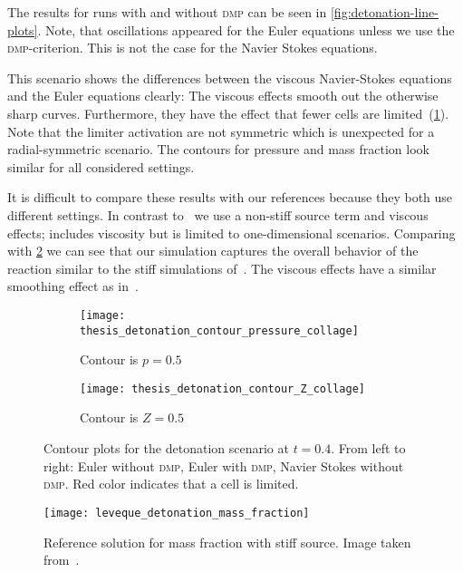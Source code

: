 The results for runs with and without \textsc{dmp} can be seen in \cref{fig:detonation-line-plots}.
Note, that oscillations appeared for the Euler equations unless we use the \textsc{dmp}-criterion.
This is not the case for the Navier Stokes equations.

This scenario shows the differences between the viscous Navier-Stokes equations and the Euler equations clearly:
The viscous effects smooth out the otherwise sharp curves.
Furthermore, they have the effect that fewer cells are limited~(\cref{fig:detonation-pressure-contour}).
Note that the limiter activation are not symmetric which is unexpected for a radial-symmetric scenario.
The contours for pressure and mass fraction look similar for all considered settings.

It is difficult to compare these results with our references because they both use different settings.
In contrast to~\cite{helzel2000modified} we use a non-stiff source term and viscous effects; \cite{hidalgo2011ader} includes viscosity but is limited to one-dimensional scenarios.
Comparing with \cref{fig:detonation-contour-reference} we can see that our simulation captures the overall behavior of the reaction similar to the stiff simulations of~\cite{helzel2000modified}.
The viscous effects have a similar smoothing effect as in~\cite{hidalgo2011ader}.

\begin{figure}[htb]
  \centering
  \begin{subfigure}[t]{1.0\textwidth}
    \centering
  \texttt{[image: thesis\_detonation\_contour\_pressure\_collage]} 
  \caption{Contour is $p = 0.5$}
  \end{subfigure}
  \begin{subfigure}[t]{1.0\textwidth}
    \centering
  \texttt{[image: thesis\_detonation\_contour\_Z\_collage]} 
  \caption{Contour is $Z = 0.5$}
  \end{subfigure}
  \caption{\label{fig:detonation-pressure-contour}%
    Contour plots for the detonation scenario at $t=0.4$.
    From left to right: Euler without \textsc{dmp}, Euler with \textsc{dmp}, Navier Stokes without \textsc{dmp}.
    Red color indicates that a cell is limited.
  }
\end{figure}
\begin{figure}[H]
    \centering
    \texttt{[image: leveque\_detonation\_mass\_fraction]}
    \caption{\label{fig:detonation-contour-reference}Reference solution for mass fraction with stiff source.
      Image taken from~\cite{helzel2000modified}.}
\end{figure}


